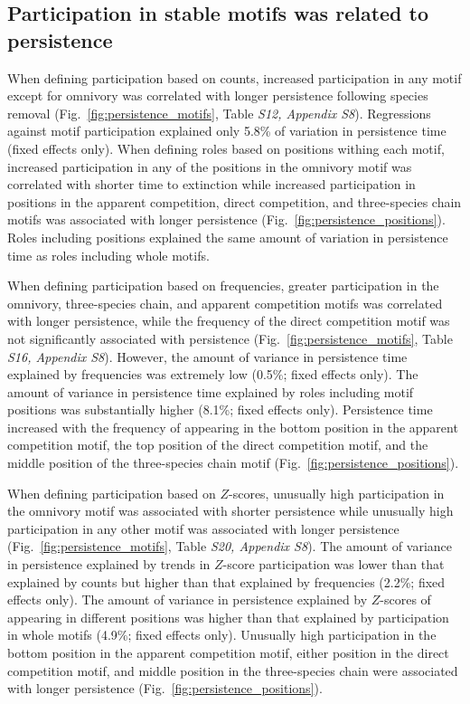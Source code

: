\documentclass[12pt]{article}
\begin{document}
\begin{spacing}{2.0}
    \subsection*{Participation in stable motifs was related to persistence}
    
        When defining participation based on counts, increased participation in any motif except for omnivory was correlated with longer persistence following species removal (Fig.~\ref{fig:persistence_motifs}, Table \emph{S12, Appendix S8}).
        Regressions against motif participation explained only 5.8\% of variation in persistence time (fixed effects only).
        When defining roles based on positions withing each motif,  increased participation in any of the positions in the omnivory motif was correlated with shorter time to extinction while increased participation in positions in the apparent competition, direct competition, and three-species chain motifs was associated with longer persistence (Fig.~\ref{fig:persistence_positions}).
        Roles including positions explained the same amount of variation in persistence time as roles including whole motifs.
        
        
        When defining participation based on frequencies, greater participation in the omnivory, three-species chain, and apparent competition motifs was correlated with longer persistence, while the frequency of the direct competition motif was not significantly associated with persistence (Fig.~\ref{fig:persistence_motifs}, Table \emph{S16, Appendix S8}).
        However, the amount of variance in persistence time explained by frequencies was extremely low (0.5\%; fixed effects only). 
        The amount of variance in persistence time explained by roles including motif positions was substantially higher (8.1\%; fixed effects only).
        Persistence time increased with the frequency of appearing in the bottom position in the apparent competition motif, the top position of the direct competition motif, and the middle position of the three-species chain motif (Fig.~\ref{fig:persistence_positions}).

        
        When defining participation based on $Z$-scores, unusually high participation in the omnivory motif was associated with shorter persistence while unusually high participation in any other motif was associated with longer persistence (Fig.~\ref{fig:persistence_motifs}, Table \emph{S20, Appendix S8}).
        The amount of variance in persistence explained by trends in $Z$-score participation was lower than that explained by counts but higher than that explained by frequencies (2.2\%; fixed effects only).
        The amount of variance in persistence explained by $Z$-scores of appearing in different positions was higher than that explained by participation in whole motifs (4.9\%; fixed effects only).
        Unusually high participation in the bottom position in the apparent competition motif, either position in the direct competition motif, and middle position in the three-species chain were associated with longer persistence (Fig.~\ref{fig:persistence_positions}).



\end{spacing}
\end{document}
